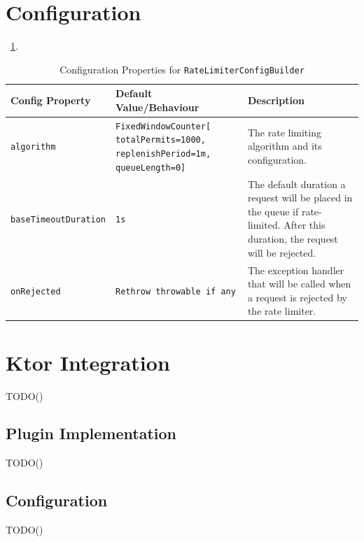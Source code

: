 \section{Configuration}\label{sec:rate-limiter-configuration}

~\ref{tab:ratelimiter-config-builder}.

\begin{table}[!htb]
    \centering
    \caption{Configuration Properties for \texttt{RateLimiterConfigBuilder}}
    \label{tab:ratelimiter-config-builder}
    \vspace{0.3cm}
    \begin{tabular}{|p{5cm}|p{5cm}|p{6cm}|}
        \hline
        \textbf{Config Property} & \textbf{Default Value/Behaviour}                                                   & \textbf{Description}                               \\ \hline
        \texttt{algorithm}       & \texttt{FixedWindowCounter[ totalPermits=1000, replenishPeriod=1m, queueLength=0]} & The rate limiting algorithm and its configuration.                                                                                                         \\ \hline
        \texttt{baseTimeoutDuration} & \texttt{1s} & The default duration a request will be placed in the queue
        if rate-limited.
        After this duration, the request will be rejected. \\ \hline
        \texttt{onRejected} & \texttt{Rethrow throwable
        if any} & The exception handler that will be called when a request is rejected by the rate limiter. \\ \hline
    \end{tabular}
\end{table}

\resilienceMechanismDefaultConfig


\section{Ktor Integration}\label{sec:rate-limiter-ktor-integration}

TODO()

\subsection{Plugin Implementation}\label{subsec:rate-limiter-plugin}

TODO()

\subsection{Configuration}\label{subsec:rate-limiter-configuration}

TODO()
